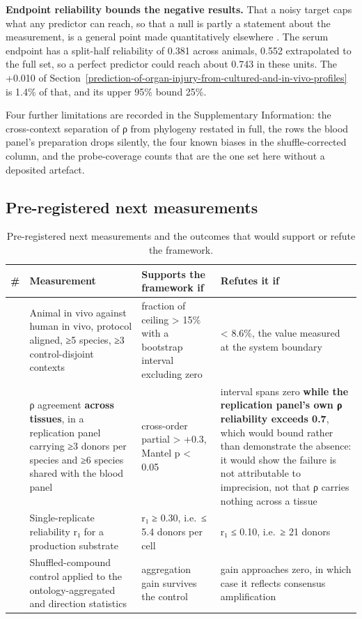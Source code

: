 \documentclass[11pt,a4paper]{article}
\begin{document}
\textbf{Endpoint reliability bounds the negative results.} That a noisy
target caps what any predictor can reach, so that a null is partly a
statement about the measurement, is a general point made quantitatively
elsewhere \cite{ref56}. The serum endpoint has a split-half reliability of
0.381 across animals, 0.552 extrapolated to the full set, so a perfect
predictor could reach about 0.743 in these units. The +0.010 of Section~\ref{prediction-of-organ-injury-from-cultured-and-in-vivo-profiles} is 1.4\% of that, and its upper 95\% bound 25\%.

Four further limitations are recorded in the Supplementary Information:
the cross-context separation of ρ from phylogeny restated in full, the
rows the blood panel's preparation drops silently, the four known biases
in the shuffle-corrected column, and the probe-coverage counts that are
the one set here without a deposited artefact.

\subsection{Pre-registered next
measurements}\label{pre-registered-next-measurements}

\begin{table}[!htbp]
\centering
\small
\caption{Pre-registered next measurements and the outcomes that would support or refute the framework.}\label{tab:4}
\begin{tabular}{@{}>{\raggedright\arraybackslash}p{}
>{\raggedright\arraybackslash}p{}
>{\raggedright\arraybackslash}p{}
>{\raggedright\arraybackslash}p{}@{}}
\toprule
\textbf{\#} & \textbf{Measurement} & \textbf{Supports the framework if} & \textbf{Refutes it if} \\
\midrule
1 & Animal in vivo against human in vivo, protocol aligned, ≥5 species, ≥3 control-disjoint contexts & fraction of ceiling \textgreater{} 15\% with a bootstrap interval excluding zero & \textless{} 8.6\%, the value measured at the system boundary \\
\addlinespace[3pt]
2 & ρ agreement \textbf{across tissues}, in a replication panel carrying ≥3 donors per species and ≥6 species shared with the blood panel & cross-order partial \textgreater{} +0.3, Mantel p \textless{} 0.05 & interval spans zero \textbf{while the replication panel's own ρ reliability exceeds 0.7}, which would bound rather than demonstrate the absence: it would show the failure is not attributable to imprecision, not that ρ carries nothing across a tissue \\
\addlinespace[3pt]
3 & Single-replicate reliability r₁ for a production substrate & r₁ ≥ 0.30, i.e.~≤ 5.4 donors per cell & r₁ ≤ 0.10, i.e.~≥ 21 donors \\
\addlinespace[3pt]
4 & Shuffled-compound control applied to the ontology-aggregated and direction statistics & aggregation gain survives the control & gain approaches zero, in which case it reflects consensus amplification \\
\bottomrule
\end{tabular}
\end{table}
\end{document}
